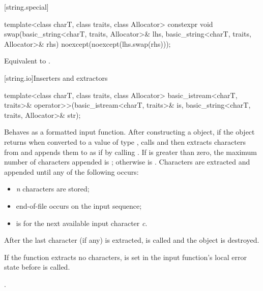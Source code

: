[string.special]{}

%
\begin{itemdecl}
template<class charT, class traits, class Allocator>
  constexpr void
    swap(basic_string<charT, traits, Allocator>& lhs,
         basic_string<charT, traits, Allocator>& rhs)
      noexcept(noexcept(lhs.swap(rhs)));
\end{itemdecl}

\begin{itemdescr}
\pnum
\effects
Equivalent to .
\end{itemdescr}

[string.io]{Inserters and extractors}

%
\begin{itemdecl}
template<class charT, class traits, class Allocator>
  basic_istream<charT, traits>&
    operator>>(basic_istream<charT, traits>& is, basic_string<charT, traits, Allocator>& str);
\end{itemdecl}

\begin{itemdescr}
\pnum
\effects
Behaves as a formatted input function.
After constructing a  object,
if the  object returns 
when converted to a value of type ,
calls 
and then extracts characters from  and appends them
to  as if by calling
.
If
is greater than zero, the maximum
number  of characters appended is
;
otherwise  is
.
Characters are extracted and appended until any of the following
occurs:
\begin{itemize}
\item
\textit{n}
characters are stored;
\item
end-of-file occurs on the input sequence;
\item
{}
is  for the next available input character
\textit{c}.
\end{itemize}

\pnum
After the last character (if any) is extracted,
is called and the
object is destroyed.

\pnum
If the function extracts no characters,
 is set in the input function's local error state
before  is called.

\pnum
\returns
{}.
\end{itemdescr}

